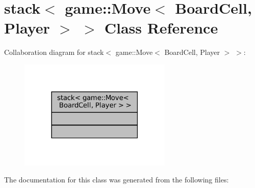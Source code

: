 \hypertarget{classstd_1_1stack_3_01game_1_1_move_3_01_board_cell_00_01_player_01_4_01_4}{}\section{stack$<$ game\+:\+:Move$<$ Board\+Cell, Player $>$ $>$ Class Reference}
\label{classstd_1_1stack_3_01game_1_1_move_3_01_board_cell_00_01_player_01_4_01_4}


Collaboration diagram for stack$<$ game\+:\+:Move$<$ Board\+Cell, Player $>$ $>$\+:
\nopagebreak
\begin{figure}[H]
\begin{center}
\leavevmode
\includegraphics[width=206pt]{classstd_1_1stack_3_01game_1_1_move_3_01_board_cell_00_01_player_01_4_01_4__coll__graph}
\end{center}
\end{figure}


The documentation for this class was generated from the following files\+: